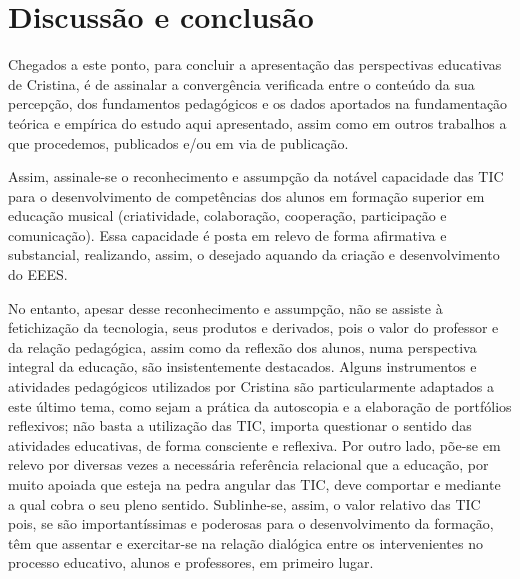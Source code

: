 \documentclass{textolivre}
\begin{document}
\section{Discussão e conclusão}\label{sec-conclusao}
Chegados a este ponto, para concluir a apresentação das perspectivas educativas
de Cristina, é de assinalar a convergência verificada entre o conteúdo da sua
percepção, dos fundamentos pedagógicos e os dados aportados na fundamentação
teórica e empírica do estudo aqui apresentado, assim como em outros trabalhos a
que procedemos, publicados e/ou em via de publicação.

Assim, assinale-se o reconhecimento e assumpção da notável capacidade das TIC
para o desenvolvimento de competências dos alunos em formação superior em
educação musical (criatividade, colaboração, cooperação, participação e
comunicação). Essa capacidade é posta em relevo de forma afirmativa e
substancial, realizando, assim, o desejado aquando da criação e desenvolvimento
do EEES.

No entanto, apesar desse reconhecimento e assumpção, não se assiste à
fetichização da tecnologia, seus produtos e derivados, pois o valor do
professor e da relação pedagógica, assim como da reflexão dos alunos, numa
perspectiva integral da educação, são insistentemente destacados. Alguns
instrumentos e atividades pedagógicos utilizados por Cristina são
particularmente adaptados a este último tema, como sejam a prática da
autoscopia e a elaboração de portfólios reflexivos; não basta a utilização das
TIC, importa questionar o sentido das atividades educativas, de forma
consciente e reflexiva. Por outro lado, põe-se em relevo por diversas vezes a
necessária referência relacional que a educação, por muito apoiada que esteja
na pedra angular das TIC, deve comportar e mediante a qual cobra o seu pleno
sentido. Sublinhe-se, assim, o valor relativo das TIC pois, se são
importantíssimas e poderosas para o desenvolvimento da formação, têm que
assentar e exercitar-se na relação dialógica entre os intervenientes no
processo educativo, alunos e professores, em primeiro lugar.
\end{document}
